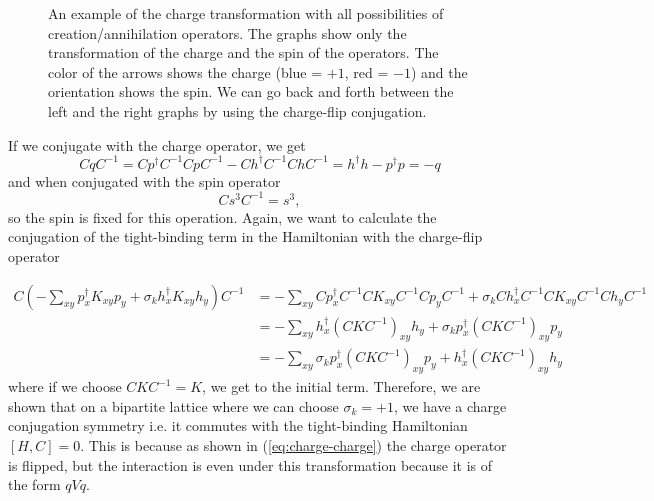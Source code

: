 \begin{figure}
\begin{center}
  \end{center}
  \caption{An example of the charge transformation with all possibilities of creation/annihilation operators. The graphs show only the transformation of the charge and the spin of the operators. The color of the arrows shows the charge (blue = $+1$, red = $-1$) and the orientation shows the spin. We can go back and forth between the left and the right graphs by using the charge-flip conjugation.}
  \label{fig:charge-flip}
\end{figure}
If we conjugate with the charge operator, we get
\begin{equation}
  CqC^{-1} = Cp^\dagger C^{-1}CpC^{-1} - Ch^\dagger C^{-1}ChC^{-1} = h^\dagger h - p^\dagger p = -q
  \label{eq:charge-charge}
\end{equation}
and when conjugated with the spin operator
\begin{equation}
  Cs^3C^{-1} = s^3,
\end{equation}
so the spin is fixed for this operation. Again, we want to calculate the conjugation of the tight-binding term in the Hamiltonian with the charge-flip operator

\begin{align*}
  C\left( -\sum_{xy} p^\dagger_x K_{xy} p_y + \sigma_k h^\dagger_x K_{xy} h_y\right) C^{-1} &= -\sum_{xy} C p^\dagger_x C^{-1}C K_{xy} C^{-1}C p_y C^{-1} + \sigma_k C h^\dagger_x C^{-1}C K_{xy} C^{-1}C h_y C^{-1}
  \\
  &= -\sum_{xy}  h^\dagger_x (C K C^{-1})_{xy} h_y + \sigma_k p^\dagger_x (C K C^{-1})_{xy} p_y
  \\
  &= -\sum_{xy}  \sigma_k p^\dagger_x (C K C^{-1})_{xy} p_y + h^\dagger_x (C K C^{-1})_{xy} h_y
\end{align*}
where if we choose $CKC^{-1} = K$, we get to the initial term. Therefore, we are shown that on a bipartite lattice where we can choose $\sigma_k = +1$, we have a charge conjugation symmetry i.e. it commutes with the tight-binding Hamiltonian $[H,C] = 0$. This is because as shown in (\cref{eq:charge-charge}) the charge operator is flipped, but the interaction is even under this transformation because it is of the form $qVq$.

